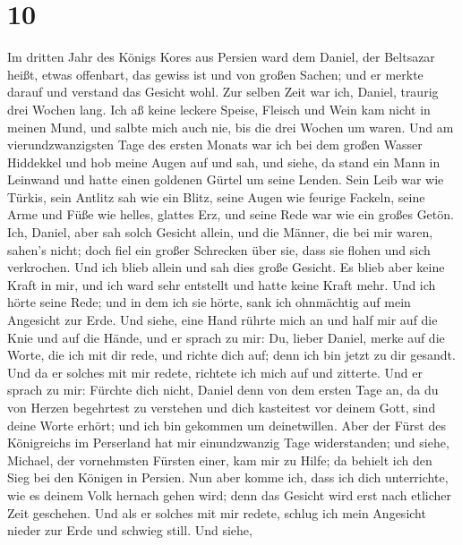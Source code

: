 \hypertarget{section-9}{%
\section{10}\label{section-9}}

 Im dritten Jahr des Königs Kores aus Persien ward dem
Daniel, der Beltsazar heißt, etwas offenbart, das gewiss ist und von
großen Sachen; und er merkte darauf und verstand das Gesicht wohl.
 Zur selben Zeit war ich, Daniel, traurig drei Wochen
lang.  Ich aß keine leckere Speise, Fleisch und Wein kam
nicht in meinen Mund, und salbte mich auch nie, bis die drei Wochen um
waren.  Und am vierundzwanzigsten Tage des ersten Monats
war ich bei dem großen Wasser Hiddekkel  und hob meine
Augen auf und sah, und siehe, da stand ein Mann in Leinwand und hatte
einen goldenen Gürtel um seine Lenden.  Sein Leib war wie
Türkis, sein Antlitz sah wie ein Blitz, seine Augen wie feurige Fackeln,
seine Arme und Füße wie helles, glattes Erz, und seine Rede war wie ein
großes Getön.  Ich, Daniel, aber sah solch Gesicht allein,
und die Männer, die bei mir waren, sahen's nicht; doch fiel ein großer
Schrecken über sie, dass sie flohen und sich verkrochen. 
Und ich blieb allein und sah dies große Gesicht. Es blieb aber keine
Kraft in mir, und ich ward sehr entstellt und hatte keine Kraft mehr.
 Und ich hörte seine Rede; und in dem ich sie hörte, sank
ich ohnmächtig auf mein Angesicht zur Erde.  Und siehe,
eine Hand rührte mich an und half mir auf die Knie und auf die Hände,
 und er sprach zu mir: Du, lieber Daniel, merke auf die
Worte, die ich mit dir rede, und richte dich auf; denn ich bin jetzt zu
dir gesandt. Und da er solches mit mir redete, richtete ich mich auf und
zitterte.  Und er sprach zu mir: Fürchte dich nicht,
Daniel denn von dem ersten Tage an, da du von Herzen begehrtest zu
verstehen und dich kasteitest vor deinem Gott, sind deine Worte erhört;
und ich bin gekommen um deinetwillen.  Aber der Fürst des
Königreichs im Perserland hat mir einundzwanzig Tage widerstanden; und
siehe, Michael, der vornehmsten Fürsten einer, kam mir zu Hilfe; da
behielt ich den Sieg bei den Königen in Persien.  Nun
aber komme ich, dass ich dich unterrichte, wie es deinem Volk hernach
gehen wird; denn das Gesicht wird erst nach etlicher Zeit geschehen.
 Und als er solches mit mir redete, schlug ich mein
Angesicht nieder zur Erde und schwieg still.  Und siehe,
